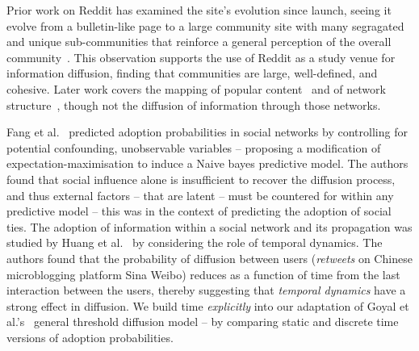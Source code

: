 \documentclass[acmsmall]{acmart}
\begin{document}
Prior work on Reddit has examined the site's evolution since launch, seeing it evolve from a bulletin-like page to a large community site with many segragated and unique sub-communities that reinforce a general perception of the overall community~\cite{singer2014evolution}.
This observation supports the use of Reddit as a study venue for information diffusion, finding that communities are large, well-defined, and cohesive.
Later work covers the mapping of popular content~\cite{weninger2015random} and of network structure~\cite{olson2015navigating}, though not the diffusion of information through those networks.

Fang et al.~\cite{fang2013predicting} predicted adoption probabilities in social networks by controlling for potential confounding, unobservable variables -- proposing a modification of expectation-maximisation to induce a Naive bayes predictive model.
The authors found that social influence alone is insufficient to recover the diffusion process, and thus external factors -- that are latent -- must be countered for within any predictive model -- this was in the context of predicting the adoption of social ties.
The adoption of information within a social network and its propagation was studied by Huang et al.~\cite{huang2014temporal} by considering the role of temporal dynamics.
The authors found that the probability of diffusion between users (\emph{retweets} on Chinese microblogging platform Sina Weibo) reduces as a function of time from the last interaction between the users, thereby suggesting that \emph{temporal dynamics} have a strong effect in diffusion.
We build time \emph{explicitly} into our adaptation of Goyal et al.'s~\cite{goyal2010learning} general threshold diffusion model -- by comparing static and discrete time versions of adoption probabilities.



%
\end{document}
